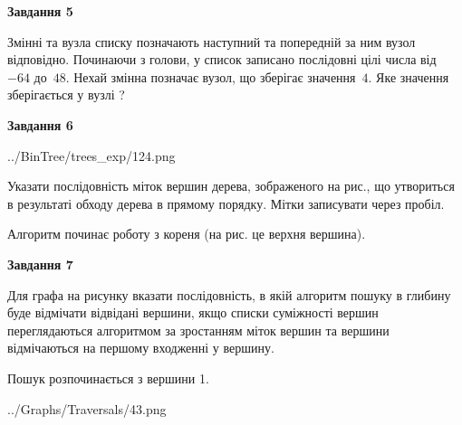 \documentclass[12pt, ukrainian]{article}
\begin{document}
{\begin {large}
{\begin {center}\textbf{Завдання 5}\end {center}}\par
Змінні  та  вузла списку позначають наступний та попередній за ним вузол відповідно. Починаючи з голови, у список записано послідовні цілі числа від~$-64$ до~$48$. Нехай змінна  позначає вузол, що зберігає значення~$4$.
Яке значення зберігається у вузлі  ?\par
\newpage

{\begin {center}\textbf{Завдання 6}\end {center}}\par

\begin{center}
	{../BinTree/trees_exp/124.png}
\end{center}
Указати послідовність міток вершин дерева, зображеного на рис., що утвориться в результаті обходу дерева в прямому порядку. Мітки записувати через пробіл.\par Алгоритм починає роботу з кореня (на рис. це верхня вершина).\par
\newpage

{\begin {center}\textbf{Завдання 7}\end {center}}\par
Для графа на рисунку вказати послідовність, в якій алгоритм пошуку в глибину буде відмічати відвідані вершини, якщо списки суміжності вершин переглядаються алгоритмом за зростанням міток вершин та вершини відмічаються на першому вход\-женні у вершину.\par
Пошук розпочинається з вершини 1.\par

\begin{center}
	{../Graphs/Traversals/43.png}
\end{center}\par
\newpage


\end{large}}
\end{document}
